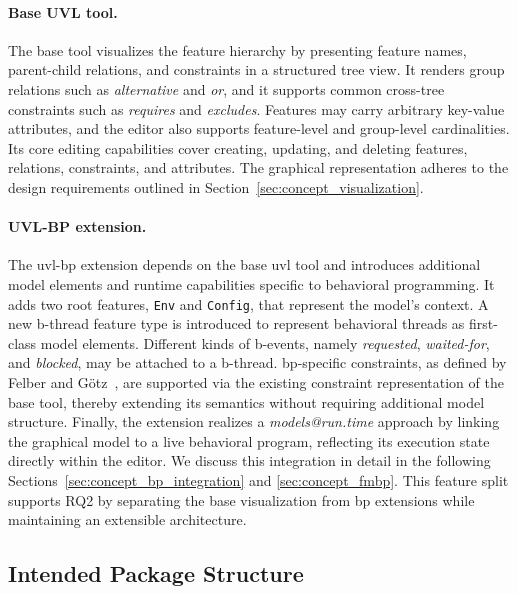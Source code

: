 \paragraph{Base UVL tool.}
The base tool visualizes the feature hierarchy by presenting feature names, parent-child relations, and constraints in a structured tree view.
It renders group relations such as \textit{alternative} and \textit{or}, and it supports common cross-tree constraints such as \textit{requires} and \textit{excludes}.
Features may carry arbitrary key-value attributes, and the editor also supports feature-level and group-level cardinalities.
Its core editing capabilities cover creating, updating, and deleting features, relations, constraints, and attributes.
The graphical representation adheres to the design requirements outlined in Section~\ref{sec:concept_visualization}.

\paragraph{UVL-BP extension.}
The \gls{uvl}-\gls{bp} extension depends on the base \gls{uvl} tool and introduces additional model elements and runtime capabilities specific to behavioral programming.
It adds two root features, \texttt{Env} and \texttt{Config}, that represent the model's context.
A new b-thread feature type is introduced to represent behavioral threads as first-class model elements.
Different kinds of b-events, namely \textit{requested}, \textit{waited-for}, and \textit{blocked}, may be attached to a b-thread.
\gls{bp}-specific constraints, as defined by Felber and Götz~\cite{felber_behavioral_2025}, are supported via the existing constraint representation of the base tool, thereby extending its semantics without requiring additional model structure.
Finally, the extension realizes a \textit{models@run.time} approach by linking the graphical model to a live behavioral program, reflecting its execution state directly within the editor.
We discuss this integration in detail in the following Sections~\ref{sec:concept_bp_integration} and \ref{sec:concept_fmbp}.
This feature split supports RQ2 by separating the base visualization from \gls{bp} extensions while maintaining an extensible architecture.

\subsection{Intended Package Structure}
\label{subsec:concept_glsp_package_structure}

